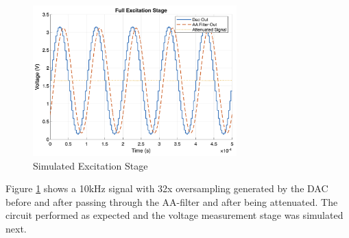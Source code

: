 \begin{figure}[H]
    \centering
    \includegraphics[width=0.7\textwidth]{FullExcitationStage.png}
    \caption{Simulated Excitation Stage}
    \label{fig:excitation_sim}
\end{figure}

Figure \ref{fig:excitation_sim} shows a 10kHz signal with 32x oversampling generated by the DAC before and after passing through the AA-filter and after being attenuated. The circuit performed as expected and the voltage measurement stage was simulated next.

